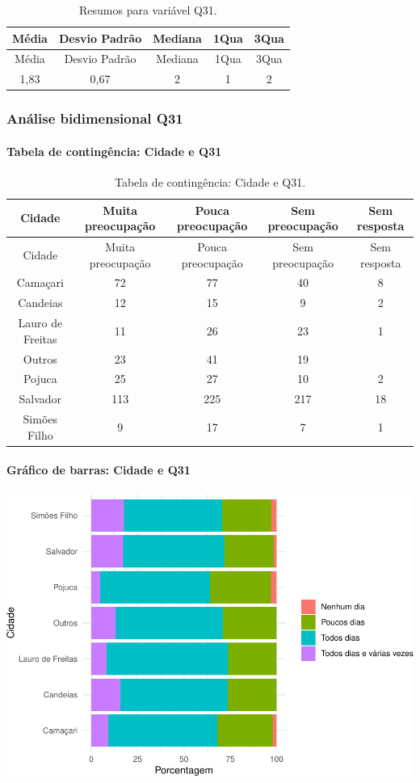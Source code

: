 \documentclass[]{article}
\let\oldparagraph\paragraph
\renewcommand{\paragraph}[1]{\oldparagraph{#1}\mbox{}}
\begin{document}
\begin{longtable}[]{@{}ccccc@{}}
\caption{\label{tab:unnamed-chunk-1015}Resumos para variável Q31.}\tabularnewline
\toprule
Média & Desvio Padrão & Mediana & 1Qua & 3Qua\tabularnewline
\midrule
\endfirsthead
\toprule
Média & Desvio Padrão & Mediana & 1Qua & 3Qua\tabularnewline
\midrule
\endhead
1,83 & 0,67 & 2 & 1 & 2\tabularnewline
\bottomrule
\end{longtable}

\cleardoublepage

\hypertarget{anuxe1lise-bidimensional-q31}{%
\subsubsection{Análise bidimensional Q31}\label{anuxe1lise-bidimensional-q31}}

\hypertarget{tabela-de-continguxeancia-cidade-e-q31}{%
\paragraph{Tabela de contingência: Cidade e Q31}\label{tabela-de-continguxeancia-cidade-e-q31}}

\begin{longtable}[]{@{}ccccc@{}}
\caption{\label{tab:unnamed-chunk-1016}Tabela de contingência: Cidade e Q31.}\tabularnewline
\toprule
Cidade & Muita preocupação & Pouca preocupação & Sem preocupação & Sem resposta\tabularnewline
\midrule
\endfirsthead
\toprule
Cidade & Muita preocupação & Pouca preocupação & Sem preocupação & Sem resposta\tabularnewline
\midrule
\endhead
Camaçari & 72 & 77 & 40 & 8\tabularnewline
Candeias & 12 & 15 & 9 & 2\tabularnewline
Lauro de Freitas & 11 & 26 & 23 & 1\tabularnewline
Outros & 23 & 41 & 19 &\tabularnewline
Pojuca & 25 & 27 & 10 & 2\tabularnewline
Salvador & 113 & 225 & 217 & 18\tabularnewline
Simões Filho & 9 & 17 & 7 & 1\tabularnewline
\bottomrule
\end{longtable}

\hypertarget{gruxe1fico-de-barras-cidade-e-q31}{%
\paragraph{Gráfico de barras: Cidade e Q31}\label{gruxe1fico-de-barras-cidade-e-q31}}

\begin{center}\includegraphics[width=0.75\linewidth]{relatorio_covid19_files/figure-latex/unnamed-chunk-1017-1} \end{center}
\end{document}
